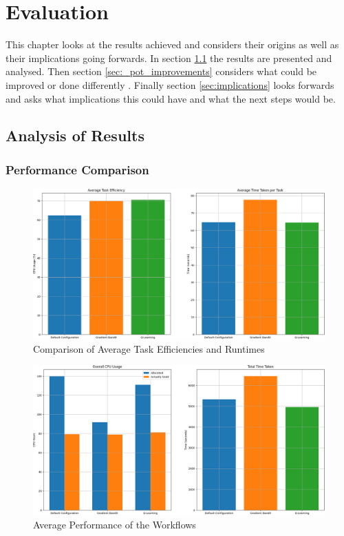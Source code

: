 
\cleardoublepage
\chapter{Evaluation}
\label{cha:evaluation}

This chapter looks at the results achieved and considers their origins as well as their implications going forwards. In section \ref{sec:analysis} the results are presented and analysed. Then  section \ref{sec:_pot_improvements} considers what could be improved or done differently . Finally section \ref{sec:implications} looks forwards and asks what implications this could have and what the next steps would be.

\section{Analysis of Results}
\label{sec:analysis}

\subsection{Performance Comparison}
\label{sub:comp_perf}

\begin{figure}
    \centering
        \includegraphics[width=\textwidth]{fig/cropped_per_task_results.png}
        \caption{Comparison of Average Task Efficiencies and Runtimes}
        \label{fig:task_results}
\end{figure}

\begin{figure}
    \centering
        \includegraphics[width=\textwidth]{fig/cropped_wf_results.png}
        \caption{Average Performance of the Workflows}
        \label{fig:wf_results}
\end{figure}

